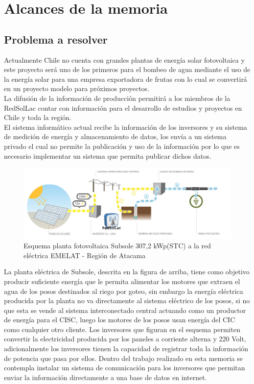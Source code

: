 \chapter{Alcances de la memoria}
\label{alcansces}

\section{Problema a resolver}

Actualmente Chile no cuenta con grandes plantas de energía solar fotovoltaica y este proyecto será uno de los primeros para el bombeo de agua mediante el uso de la energía solar para una empresa exportadora de frutas con lo cual se convertirá en un proyecto modelo para próximos proyectos.\\

La difusión de la información de producción permitirá a los miembros de la RedSolLac contar con información para el desarrollo de estudios y proyectos en Chile y toda la región.\\

El sistema informático actual recibe la información de los inversores y su sistema de medición de energía y almacenamiento de datos, los envía a un sistema privado el cual no permite la publicación y uso de la información por lo que es necesario implementar un sistema que permita publicar dichos datos.\\

\begin{figure}[h!]
        \centering
        \includegraphics[scale=0.4]{images/plantaSubSoleEsquema}
        \caption{Esquema planta fotovoltaica Subsole 307,2 kWp(STC) a la red eléctrica EMELAT - Región de Atacama}
\end{figure}

La planta eléctrica de Subsole, descrita en la figura de arriba, tiene como objetivo producir suficiente energía que le permita alimentar los motores que extraen el agua de los posos destinados al riego por goteo, sin embargo la energía eléctrica producida por la planta no va directamente al sistema eléctrico de los posos, si no que esta se vende al sistema interconectado central actuando como un productor de energía para el CISC, luego los motores de los posos usan energía del CIC como cualquier otro cliente. Los inversores que figuran en el esquema permiten convertir la electricidad producida por los paneles a corriente alterna y 220 Volt, adicionalmente los inversores tienen la capacidad de registrar toda la información de potencia que pasa por ellos. Dentro del trabajo realizado en esta memoria se contempla instalar un sistema de comunicación para los inversores que permitan enviar la información directamente a una base de datos en internet.

